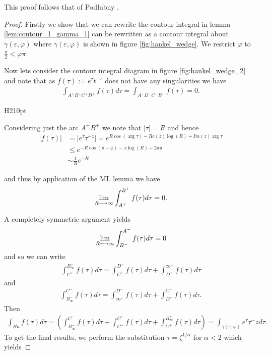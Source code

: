 This proof follows that of Podlubny \cite{Podlubny1999}.
\begin{proof}

Firstly we show that we can rewrite the contour integral in lemma \ref{lem:contour_1_gamma_1} can be rewritten as a contour
integral about $ \gamma(\varepsilon, \varphi) $ where $ \gamma(\varepsilon, \varphi) $ is shown in figure \ref{fig:hankel_wedge}. We restrict $ \varphi $ to $ \frac{\pi}{2} < \varphi \pi $. 

Now lets consider the contour integral diagram in figure \ref{fig:hankel_wedge_2} and note that as $ f(\tau) := e^\tau t^{-z} $ does not have any singularities we have
\begin{align}
    \int_{A^+ B^+ C^+ D^+} f(\tau) d\tau = \int_{A^-D^-C^-B^-} f(\tau) = 0.
\end{align}

 \begin{wrapfigure}{H}{210pt}

\caption{The Hankel countour $ \gamma(\varepsilon, \varphi) $}
\label{fig:hankel_wedge}
\end{wrapfigure}

Considering just the arc $ A^+B^+ $ we note that $ |\tau| = R $ and hence
\begin{align*}
    |f(\tau)| &= |e^\tau \tau^{-z}| = e^{R\cos(\arg \tau) - Re(z) \log(R) + Im(z) \arg \tau} \\
      &\leq e^{-R\cos(\pi - \phi) - x \log(R) + 2 \pi y} \\
      &\sim \frac{1}{R}e^{-R}
\end{align*}

and thus by application of the ML lemma we have
\begin{align*}
    \lim_{R \longrightarrow \infty} \int_{A^+}^{B^+} f(\tau) d\tau = 0.
\end{align*}


A completely symmetric argument yields
\begin{align*}
    \lim_{R \longrightarrow \infty} \int_{B^-}^{A^-} f(\tau) d\tau = 0
\end{align*}
and so we can write
\begin{align*}
    \int_{C^+}^{B_\infty^+} f(\tau)d\tau = \int_{C^+}^{D^+} f(\tau)d\tau + \int_{D^+}^{\infty^+} f(\tau)d\tau
\end{align*}
and
\begin{align*}
    \int_{B_\infty^-}^{C^-} f(\tau)d\tau = \int_{\infty^-}^{D^-} f(\tau)d\tau + \int_{D^-}^{C^-} f(\tau)d\tau.
\end{align*}
Then
\begin{align*}
    \int_{Ha} f(\tau) d\tau = \left( \int_{B_\infty^-}^{C^-} f(\tau)d\tau + \int_{C^-}^{C^+} f(\tau)d\tau +  \int_{C^+}^{B_\infty^+} f(\tau)d\tau \right) = \int_{\gamma(\varepsilon, \varphi)}e^\tau \tau^-z d\tau.
\end{align*}
To get the final results, we perform the substitution $ \tau = \zeta^{1/\alpha} $ for $ \alpha < 2 $
which yields


\end{proof}
